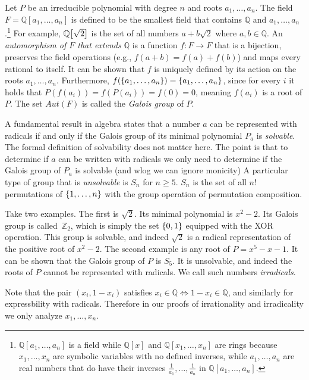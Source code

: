 \documentclass[preprint,12pt,authoryear]{elsarticle}
\newcommand{\Z}{\mathbb{Z}}
\newcommand{\Q}{\mathbb{Q}}
\DeclarePairedDelimiter{\iop}{(}{)}
\DeclarePairedDelimiter{\iob}{[}{]}
\DeclarePairedDelimiter{\ios}{\{}{\}}
\newcommand{\p}{\iop*}
\newcommand{\s}{\ios*}
\renewcommand{\b}{\iob*}
\begin{document}
Let $P$ be an irreducible polynomial with degree $n$ and roots $a_1,\ldots,a_n$. The field 
$F=\Q[a_1,\ldots,a_n]$ is defined to be the smallest field that contains $\Q$ and 
$a_1,\ldots,a_n$.\footnote{$\Q[a_1,\ldots,a_n]$ is a field while $\Q[x]$ and $\Q[x_1,\ldots,x_n]$ 
are rings because $x_1,\ldots,x_n$ are symbolic variables with no defined inverses, while 
$a_1,\ldots,a_n$ are real numbers that do have their inverses $\frac{1}{a_1},\ldots,\frac{1}{a_n}$ in $\Q[a_1,\ldots,a_n]$.} For example, 
$\Q\b{\sqrt2}$ is the set of all numbers $a+b\sqrt2$ where $a,b\in\Q$. An 
\emph{automorphism of $F$ that extends $\Q$} is a function $f:F\to F$ that is a bijection, 
preserves the field operations (e.g., $f(a+b)=f(a)+f(b)$) and maps every rational to 
itself. It can be shown that $f$ is uniquely defined by its action on the roots 
$a_1,\ldots,a_n$. Furthermore, $f\p{\s{a_1,\ldots,a_n}}=\s{a_1,\ldots,a_n}$, since for every $i$ it 
holds that $P(f(a_i))=f(P(a_i))=f(0)=0$, meaning $f(a_i)$ is a root of $P$. The set $Aut(F)$ 
is called the \emph{Galois group} of $P$.

A fundamental result in algebra states that a number $a$ can be represented with radicals 
if and only if the Galois group of its minimal polynomial $P_a$ is \emph{solvable}. The 
formal definition of solvability does not matter here. The point is that to determine if 
$a$ can be written with radicals we only need to determine if the Galois group of $P_a$ is 
solvable (and wlog we can ignore monicity) A particular type of group that is \emph{unsolvable} is $S_n$ for $n\ge5$. $S_n$ 
is the set of all $n!$ permutations of $\s{1,\ldots,n}$ with the group operation of 
permutation composition.

Take two examples. The first is $\sqrt2$. Its minimal polynomial is $x^2-2$. Its Galois 
group is called~$\Z_2$, which is simply the set $\s{0,1}$ equipped with the XOR operation.  
This group is solvable, and indeed $\sqrt2$ is a radical representation of the positive 
root of $x^2-2$. The second example is any root of $P=x^5-x-1$. It can be shown that the 
Galois group of $P$ is $S_5$. It is unsolvable, and indeed the roots of $P$ cannot be 
represented with radicals. We call such numbers \emph{irradicals}.

Note that the pair $(x_i,1-x_i)$ satisfies $x_i\in\Q\iff1-x_i\in\Q$, and similarly for 
expressbility with radicals. Therefore in our proofs of irrationality and irradicality we 
only analyze $x_1,\ldots,x_n$.
\end{document}
